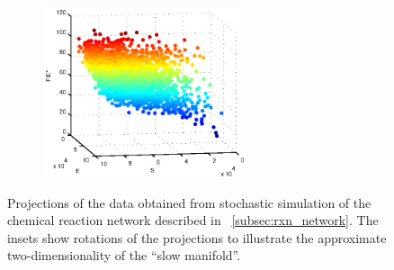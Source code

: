 \begin{figure}[t]
\begin{subfigure}{0.45\textwidth}
\caption{}
\label{subfig:rxn_manifolds3}
\end{subfigure}
\begin{subfigure}{0.45\textwidth}
\includegraphics[height=5cm]{rxn_manifold4}
\caption{}
\label{subfig:rxn_manifolds4}
\end{subfigure}
\caption[Projections of the data obtained from stochastic simulation of the chemical reaction network]{Projections of the data obtained from stochastic simulation of the chemical reaction network described in \sec~\ref{subsec:rxn_network}. The insets show rotations of the projections to illustrate the approximate two-dimensionality of the ``slow manifold''.}
    \label{fig:rxn_manifolds}
\end{figure}

